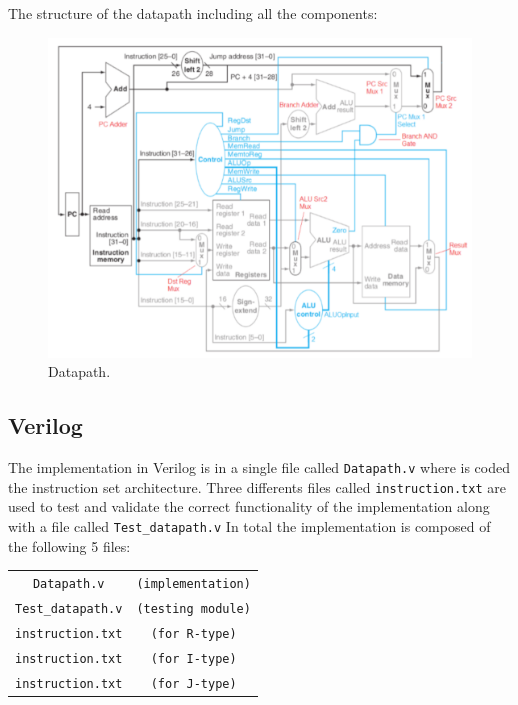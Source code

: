 \documentclass[conference]{IEEEtran}
\begin{document}
The structure of the datapath including all the components:
\begin{figure}[h]
\includegraphics[scale=2]{datapath.png}
\caption{Datapath.}
\end{figure}

\subsection{Verilog}
The implementation in Verilog is in a single file called \verb$Datapath.v$ where is coded the instruction set architecture. Three differents files called \verb$instruction.txt$ are used to test and validate the correct functionality of the implementation along with a file called \verb$Test_datapath.v$
In total the implementation is composed of the following 5 files:

\begin{table}[htbp]
\begin{center}
\begin{tabular}{c c}
\verb$Datapath.v$&\verb$(implementation)$\\
\verb$Test_datapath.v$&\verb$(testing module)$\\
\verb$instruction.txt$&\verb$(for R-type)$\\
\verb$instruction.txt$&\verb$(for I-type)$\\
\verb$instruction.txt$&\verb$(for J-type)$\\
\end{tabular}
\end{center}
\end{table}
\end{document}
